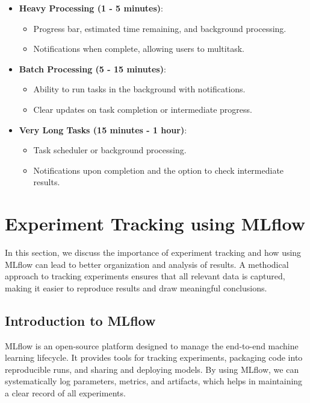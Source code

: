 \documentclass{article}
\begin{document}
\begin{landscape}
\begin{itemize}
\begin{itemize}
        \end{itemize}
    \item \textbf{Heavy Processing (1 - 5 minutes)}:
        \begin{itemize}
            \item Progress bar, estimated time remaining, and background processing.
            \item Notifications when complete, allowing users to multitask.
        \end{itemize}
    \item \textbf{Batch Processing (5 - 15 minutes)}:
        \begin{itemize}
            \item Ability to run tasks in the background with notifications.
            \item Clear updates on task completion or intermediate progress.
        \end{itemize}
    \item \textbf{Very Long Tasks (15 minutes - 1 hour)}:
        \begin{itemize}
            \item Task scheduler or background processing.
            \item Notifications upon completion and the option to check intermediate results.
        \end{itemize}
\end{itemize}

\end{landscape}

\section{Experiment Tracking using MLflow}
In this section, we discuss the importance of experiment tracking and how using MLflow can lead to better organization and analysis of results. A methodical approach to tracking experiments ensures that all relevant data is captured, making it easier to reproduce results and draw meaningful conclusions.

\subsection{Introduction to MLflow}
MLflow is an open-source platform designed to manage the end-to-end machine learning lifecycle. It provides tools for tracking experiments, packaging code into reproducible runs, and sharing and deploying models. By using MLflow, we can systematically log parameters, metrics, and artifacts, which helps in maintaining a clear record of all experiments.
\end{document}
